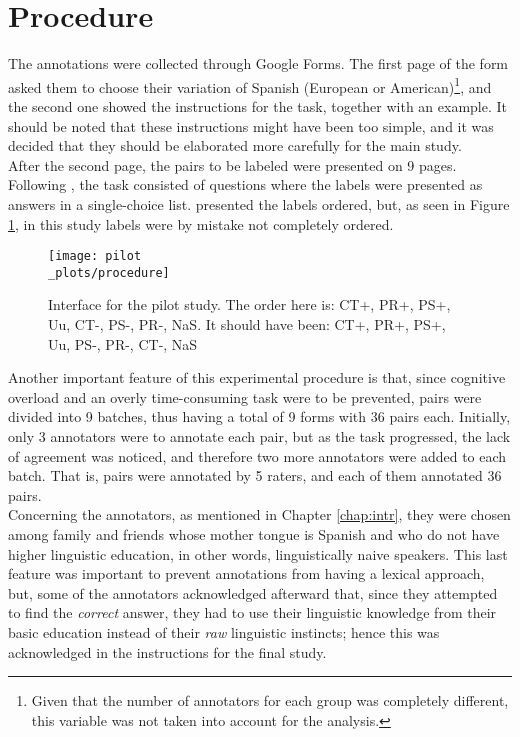 \section{Procedure}
\label{sec:pilproc}

The annotations were collected through Google Forms. The first page of the form asked them to choose their variation of Spanish (European or American)\footnote{Given that the number of annotators for each group was completely different, this variable was not taken into account for the analysis.}, and the second one showed the instructions for the task, together with an example. It should be noted that these instructions might have been too simple, and it was decided that they should be elaborated more carefully for the main study.\\

After the second page, the pairs to be labeled were presented on 9 pages. Following \citet{de2012did}, the task consisted of questions where the labels were presented as answers in a single-choice list. \citet{de2012did} presented the labels ordered, but, as seen in Figure \ref{fig:proc}, in this study labels were by mistake not completely ordered.\\ 

\begin{figure}
\centering
\parbox{12.5cm}{\texttt{[image: pilot\\\_plots/procedure]}
\caption[Interface for the pilot study.]{Interface for the pilot study. The order here is: CT+, PR+, PS+, Uu, CT-, PS-, PR-, NaS. It should have been: CT+, PR+, PS+, Uu, PS-, PR-, CT-, NaS}\label{fig:proc}}
\qquad
\end{figure}

Another important feature of this experimental procedure is that, since cognitive overload and an overly time-consuming task were to be prevented, pairs were divided into 9 batches, thus having a total of 9 forms with 36 pairs each. Initially, only 3 annotators were to annotate each pair, but as the task progressed, the lack of agreement was noticed, and therefore two more annotators were added to each batch. That is, pairs were annotated by 5 raters, and each of them annotated 36 pairs.\\

Concerning the annotators, as mentioned in Chapter \ref{chap:intr}, they were chosen among family and friends whose mother tongue is Spanish and who do not have higher linguistic education, in other words, linguistically naive speakers. This last feature was important to prevent annotations from having a lexical approach, but, some of the annotators acknowledged afterward that, since they attempted to find the \textit{correct} answer, they had to use their linguistic knowledge from their basic education instead of their \textit{raw} linguistic instincts; hence this was acknowledged in the instructions for the final study.\\

